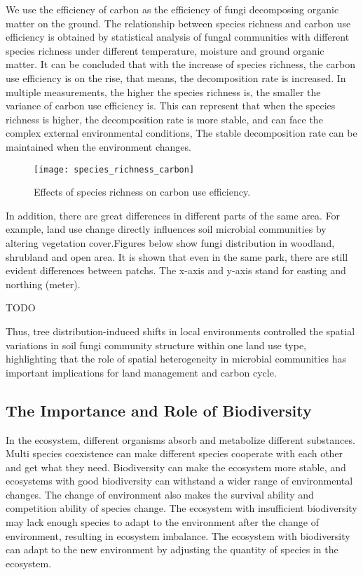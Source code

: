 \documentclass{mcmthesis}
\begin{document}
We use the efficiency of carbon as the efficiency of fungi decomposing organic matter on the ground. The relationship between species richness and carbon use efficiency is obtained by statistical analysis of fungal communities with different species richness under different temperature, moisture and ground organic matter. It can be concluded that with the increase of species richness, the carbon use efficiency is on the rise, that means, the decomposition rate is increased. In multiple measurements, the higher the species richness is, the smaller the variance of carbon use efficiency is. This can represent that when the species richness is higher, the decomposition rate is more stable, and can face the complex external environmental conditions, The stable decomposition rate can be maintained when the environment changes.


\begin{figure}[H]
  \small
  \centering
  \texttt{[image: species\_richness\_carbon]}
  \caption{Effects of species richness on carbon use efficiency.}
  \label{species_richness_carbon}
\end{figure}

In addition, there are great differences in different parts of the same area. For example, land use change directly influences soil microbial communities by altering vegetation cover\cite{li2019spatial}.Figures below show fungi distribution in woodland, shrubland and open area. It is shown that even in the same park, there are still evident differences between patchs. The x-axis and y-axis stand for easting and northing (meter).

TODO

Thus, tree distribution-induced shifts in local environments controlled the spatial variations in soil fungi community structure within one land use type, highlighting that the role of spatial heterogeneity in microbial communities has important implications for land management and carbon cycle.

\subsection{The Importance and Role of Biodiversity }

In the ecosystem, different organisms absorb and metabolize different substances. Multi species coexistence can make different species cooperate with each other and get what they need. Biodiversity can make the ecosystem more stable, and ecosystems with good biodiversity can withstand a wider range of environmental changes. The change of environment also makes the survival ability and competition ability of species change. The ecosystem with insufficient biodiversity may lack enough species to adapt to the environment after the change of environment, resulting in ecosystem imbalance. The ecosystem with biodiversity can adapt to the new environment by adjusting the quantity of species in the ecosystem.
\end{document}
